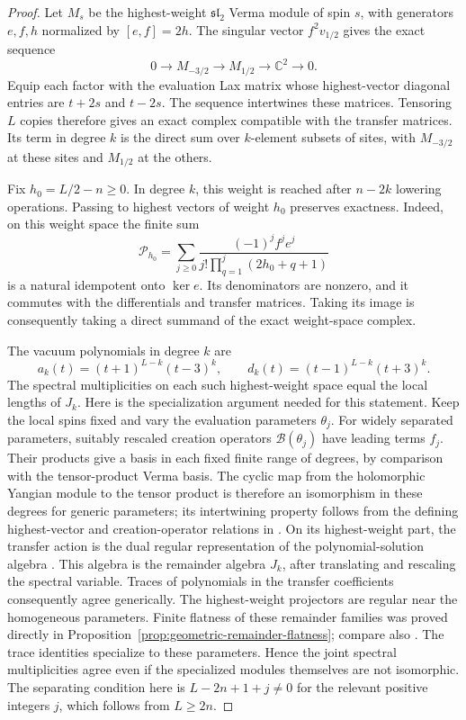 \documentclass[11pt]{article}
\theoremstyle{definition}
\newcommand{\C}{\mathbb C}
\begin{document}
\begin{proof}
Let $M_s$ be the highest-weight $\mathfrak{sl}_2$ Verma module of
spin $s$, with generators $e,f,h$ normalized by $[e,f]=2h$.
The singular vector $f^2v_{1/2}$ gives the exact sequence
\[
 0\longrightarrow M_{-3/2}\longrightarrow M_{1/2}
   \longrightarrow\C^2\longrightarrow0.
\]
Equip each factor with the evaluation Lax matrix whose highest-vector
diagonal entries are $t+2s$ and $t-2s$. The sequence intertwines these
matrices. Tensoring $L$ copies therefore gives an exact complex
compatible with the transfer matrices. Its term in degree $k$ is
the direct sum over $k$-element subsets of sites, with $M_{-3/2}$ at
these sites and $M_{1/2}$ at the others.

Fix $h_0=L/2-n\ge0$. In degree $k$, this weight is reached after
$n-2k$ lowering operations. Passing to highest vectors of weight
$h_0$ preserves exactness. Indeed, on this weight space the finite
sum
\[
 \mathcal P_{h_0}
 =\sum_{j\ge0}\frac{(-1)^j f^je^j}
                 {j!\prod_{q=1}^j(2h_0+q+1)}
\]
is a natural idempotent onto $\ker e$. Its denominators are nonzero,
and it commutes with the differentials and transfer matrices.
Taking its image is consequently taking a direct summand of the
exact weight-space complex.

The vacuum polynomials in degree $k$ are
\[
 a_k(t)=(t+1)^{L-k}(t-3)^k,\qquad
 d_k(t)=(t-1)^{L-k}(t+3)^k.
\]
The spectral multiplicities on each such highest-weight space equal
the local lengths of $J_k$. Here is the specialization argument
needed for this statement. Keep the local spins fixed and vary the
evaluation parameters $\theta_j$. For widely separated parameters,
suitably rescaled creation operators $\mathcal B(\theta_j)$ have leading
terms $f_j$. Their products give a basis in each fixed finite range
of degrees, by comparison with the tensor-product Verma basis.
The cyclic map from the holomorphic Yangian module to the tensor
product is therefore an isomorphism in these degrees for generic
parameters; its intertwining property follows from the defining
highest-vector and creation-operator relations in
\cite[Proposition~2.5.1]{MTV2009}. On its highest-weight part, the
transfer action is the dual regular representation of the
polynomial-solution algebra \cite[Corollary~7.3.2]{MTV2009}.
This algebra is the remainder algebra $J_k$, after translating and
rescaling the spectral variable. Traces of polynomials in the transfer
coefficients consequently agree generically. The highest-weight
projectors are regular near the homogeneous parameters. Finite
flatness of these remainder families was proved directly in
Proposition~\ref{prop:geometric-remainder-flatness}; compare also
\cite[Section~4.2]{MTV2009}. The trace identities specialize
to these parameters. Hence the joint spectral multiplicities agree
even if the specialized modules themselves are not isomorphic.
The separating condition here is $L-2n+1+j\ne0$ for the relevant
positive integers $j$, which follows from $L\ge2n$.


\end{proof}
\end{document}
